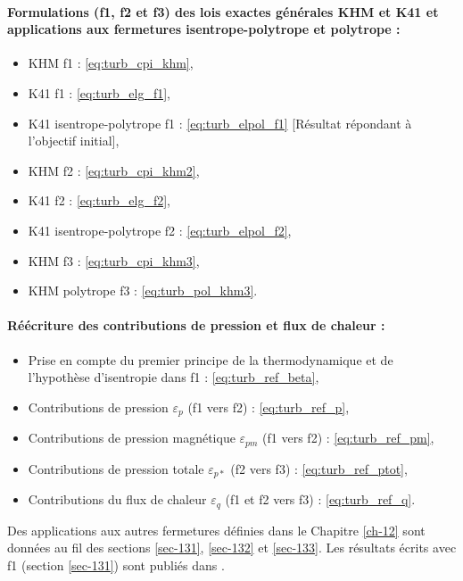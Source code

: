 {\begin{minipage}[c]{\linewidth}
\paragraph{Formulations (f1, f2 et f3) des lois exactes générales \acs{KHM} et \acs{K41} et applications aux fermetures isentrope-polytrope et polytrope :} 
\begin{itemize}
    \item \acs{KHM} f1 :  \eqref{eq:turb_cpi_khm},
    \item \acs{K41} f1 :  \eqref{eq:turb_elg_f1},
    \item \acs{K41} isentrope-polytrope f1 :  \eqref{eq:turb_elpol_f1} [Résultat répondant à l'objectif initial],
    \item \acs{KHM} f2 :  \eqref{eq:turb_cpi_khm2},
    \item \acs{K41} f2 :  \eqref{eq:turb_elg_f2},
    \item \acs{K41} isentrope-polytrope f2 :  \eqref{eq:turb_elpol_f2},
    \item \acs{KHM} f3 :  \eqref{eq:turb_cpi_khm3},
    \item \acs{KHM} polytrope f3 :  \eqref{eq:turb_pol_khm3}.
\end{itemize}

\paragraph{Réécriture des contributions de pression et flux de chaleur :}
\begin{itemize}
    \item Prise en compte du premier principe de la thermodynamique et de l'hypothèse d'isentropie dans f1 :  \eqref{eq:turb_ref_beta},
    \item Contributions de pression $\varepsilon_p$ (f1 vers f2) : \eqref{eq:turb_ref_p},
    \item Contributions de pression magnétique $\varepsilon_{pm}$ (f1 vers f2) : \eqref{eq:turb_ref_pm},
    \item Contributions de pression totale $\varepsilon_{p*}$ (f2 vers f3) : \eqref{eq:turb_ref_ptot},
    \item Contributions du flux de chaleur $\varepsilon_{q}$ (f1 et f2 vers f3) : \eqref{eq:turb_ref_q}.\\
\end{itemize}

Des applications aux autres fermetures définies dans le Chapitre \ref{ch-12} sont données au fil des sections \ref{sec-131}, \ref{sec-132} et \ref{sec-133}.
Les résultats écrits avec f1 (section \ref{sec-131}) sont publiés dans \cite{simon_general_2021}. 
\end{minipage}}


 
